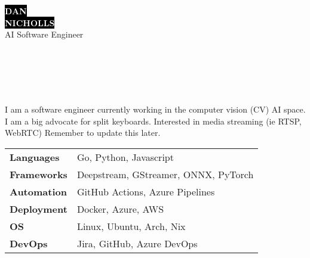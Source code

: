 \documentclass[9pt]{extarticle}
\begin{document}

\begin{minipage}[t]{0.40\textwidth}
	\vspace{-\baselineskip}
	\colorbox{black}{{\HUGE\textcolor{white}{\textbf{\MakeUppercase{Dan}}}}}\\[2pt]
	\colorbox{black}{{\HUGE\textcolor{white}{\textbf{\MakeUppercase{Nicholls}}}}}\\[6pt]
	\vspace{6pt}
	{\LARGE AI Software Engineer}
\end{minipage}
\hfill
\begin{minipage}[t]{0.50\textwidth}
	\vspace{-\baselineskip}
		\\
		\\
		\\
		\\
\end{minipage}

\vspace{0.5cm}


\begin{minipage}[t]{0.45\textwidth}
	\vspace{-\baselineskip}


	I am a software engineer currently working in the computer vision (CV) AI space. I am a big advocate for split keyboards. Interested in media streaming (ie RTSP, WebRTC) Remember to update this later.\\
\end{minipage}
\hfill 
\begin{minipage}[t]{0.5\textwidth}
	\vspace{-\baselineskip}


	\begin{tabular}{@{}p{8em} l@{}}
	\textbf{Languages}   & Go, Python, Javascript \\
	\textbf{Frameworks}  & Deepstream, GStreamer, ONNX, PyTorch \\
	\textbf{Automation}  & GitHub Actions, Azure Pipelines \\
	\textbf{Deployment}  & Docker, Azure, AWS \\
	\textbf{OS}          & Linux, Ubuntu, Arch, Nix \\
	\textbf{DevOps}      & Jira, GitHub, Azure DevOps \\
	\end{tabular}
\end{minipage}
\end{document}
